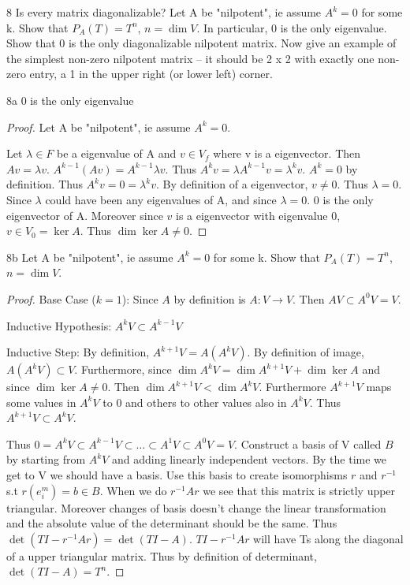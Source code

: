 \documentclass{article}
\newcommand{\rarr}[0]{\rightarrow}
\begin{document}
\bigskip

\begin{PROB}{8}\label{Problem 8.}
    Is every matrix diagonalizable? Let A be "nilpotent", ie assume $A^k = 0$ for some k. Show that $P_A(T) = T^n$, $n = \dim V$.  In particular, 0 is the only eigenvalue. Show that 0 is the only diagonalizable nilpotent matrix. Now give an example of the simplest non-zero nilpotent matrix -- it should be 2 x 2 with exactly one non-zero entry, a 1 in the upper right (or lower left) corner. 
\end{PROB}
\begin{claim}{8a}
    0 is the only eigenvalue
\end{claim}
\begin{proof}
    Let A be "nilpotent", ie assume $A^k = 0$.

    Let $\lambda \in F$ be a eigenvalue of A and $v \in V_f$ where v is a eigenvector. Then $Av = \lambda v$. $A^{k - 1}(Av) = A^{k - 1}\lambda v$. Thus $A^kv = \lambda A^{k-1}v = \lambda^kv$. $A^k = 0$ by definition. Thus $A^kv = 0 = \lambda^kv$. By definition of a eigenvector, $v \neq 0$. Thus $\lambda = 0$. Since $\lambda$ could have been any eigenvalues of A, and since $\lambda = 0$. 0 is the only eigenvector of A. Moreover since $v$ is a eigenvector with eigenvalue 0, $v \in V_0 = \ker A$. Thus $\dim \ker A \neq 0$.
\end{proof}
\begin{claim}{8b}
    Let A be "nilpotent", ie assume $A^k = 0$ for some k. Show that $P_A(T) = T^n$, $n = \dim V$.
\end{claim}
\begin{proof}
    Base Case ($k = 1$): Since $A$ by definition is $A: V \rarr V$. Then $AV \subset A^0V = V$.
    
    Inductive Hypothesis: $A^kV \subset A^{k-1}V$
    
    Inductive Step: By definition, $A^{k + 1}V = A(A^kV)$. By definition of image, $A(A^kV) \subset V$. Furthermore, since $\dim A^kV = \dim A^{k + 1}V + \dim \ker A$ and since $\dim \ker A \neq 0$. Then $\dim A^{k+1}V < \dim A^k V$. Furthermore $A^{k + 1}V$ maps some values in $A^kV$ to 0 and others to other values also in $A^kV$. Thus $A^{k + 1}V \subset A^kV$.

    Thus $ 0 = A^kV \subset A^{k-1}V \subset \ldots \subset A^{1}V \subset A^0V = V$. Construct a basis of V called $B$ by starting from $A^kV$ and adding linearly independent vectors. By the time we get to V we should have a basis. Use this basis to create isomorphisms $r$ and $r^{-1}$ s.t $r(e^m_i) = b \in B$. When we do $r^{-1}Ar$ we see that this matrix is strictly upper triangular. Moreover changes of basis doesn't change the linear transformation and the absolute value of the determinant should be the same. Thus $\det(TI - r^{-1}Ar) = \det(TI - A)$. $TI - r^{-1}Ar$ will have Ts along the diagonal of a upper triangular matrix. Thus by definition of determinant, $\det(TI - A) = T^n$.
\end{proof}
\end{document}
